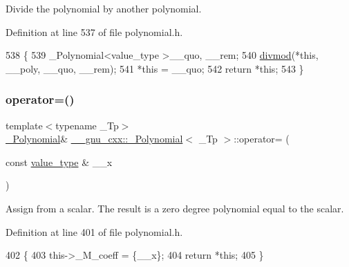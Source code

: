 Divide the polynomial by another polynomial. 

Definition at line 537 of file polynomial.\+h.


\begin{DoxyCode}
538         \{
539           \_Polynomial<value\_type >\_\_quo, \_\_rem;
540           \hyperlink{namespace____gnu__cxx_abe506cf34c921c378a681f0de31d49a5}{divmod}(*\textcolor{keyword}{this}, \_\_poly, \_\_quo, \_\_rem);
541           *\textcolor{keyword}{this} = \_\_quo;
542           \textcolor{keywordflow}{return} *\textcolor{keyword}{this};
543         \}
\end{DoxyCode}
\mbox{\label{class____gnu__cxx_1_1__Polynomial_a207a09b3f170adcfbf21c26821c864dd}} 
\subsubsection{\texorpdfstring{operator=()}{operator=()}\hspace{0.1cm}{\footnotesize\ttfamily [1/4]}}
{\footnotesize\ttfamily template$<$typename \+\_\+\+Tp$>$ \\
\hyperlink{class____gnu__cxx_1_1__Polynomial}{\+\_\+\+Polynomial}\& \hyperlink{class____gnu__cxx_1_1__Polynomial}{\+\_\+\+\_\+gnu\+\_\+cxx\+::\+\_\+\+Polynomial}$<$ \+\_\+\+Tp $>$\+::operator= (\begin{DoxyParamCaption}\item[{const \hyperlink{class____gnu__cxx_1_1__Polynomial_a725563351f50e76084a7a016c06f8a53}{value\+\_\+type} \&}]{\+\_\+\+\_\+x }\end{DoxyParamCaption})\hspace{0.3cm}{\ttfamily [inline]}}

Assign from a scalar. The result is a zero degree polynomial equal to the scalar. 

Definition at line 401 of file polynomial.\+h.


\begin{DoxyCode}
402       \{
403         this->\_M\_coeff = \{\_\_x\};
404         \textcolor{keywordflow}{return} *\textcolor{keyword}{this};
405       \}
\end{DoxyCode}
\mbox{\label{class____gnu__cxx_1_1__Polynomial_a96aa1f47da636376d63cf099558113b8}} 
